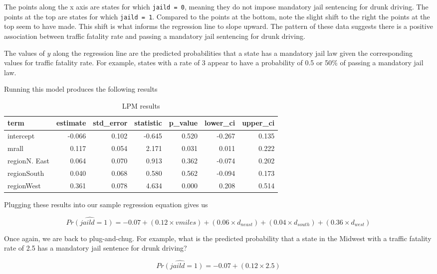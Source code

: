 \documentclass[
]{book}
\begin{document}
The points along the x axis are states for which \texttt{jaild\ =\ 0}, meaning they do not impose mandatory jail sentencing for drunk driving. The points at the top are states for which \texttt{jaild\ =\ 1}. Compared to the points at the bottom, note the slight shift to the right the points at the top seem to have made. This shift is what informs the regression line to slope upward. The pattern of these data suggests there is a positive association between traffic fatality rate and passing a mandatory jail sentencing for drunk driving.

The values of \(y\) along the regression line are the predicted probabilities that a state has a mandatory jail law given the corresponding values for traffic fatality rate. For example, states with a rate of 3 appear to have a probability of 0.5 or 50\% of passing a mandatory jail law.

Running this model produces the following results

\begin{table}

\caption{\label{tab:lpmresults}LPM results}
\centering
\begin{tabular}[t]{l|r|r|r|r|r|r}
\hline
term & estimate & std\_error & statistic & p\_value & lower\_ci & upper\_ci\\
\hline
intercept & -0.066 & 0.102 & -0.645 & 0.520 & -0.267 & 0.135\\
\hline
mrall & 0.117 & 0.054 & 2.171 & 0.031 & 0.011 & 0.222\\
\hline
regionN. East & 0.064 & 0.070 & 0.913 & 0.362 & -0.074 & 0.202\\
\hline
regionSouth & 0.040 & 0.068 & 0.580 & 0.562 & -0.094 & 0.173\\
\hline
regionWest & 0.361 & 0.078 & 4.634 & 0.000 & 0.208 & 0.514\\
\hline
\end{tabular}
\end{table}

Plugging these results into our sample regression equation gives us

\[\hat{Pr(jaild=1)}= -0.07 + (0.12 \times vmiles) + (0.06 \times d_{neast}) + (0.04 \times d_{south}) + (0.36 \times d_{west})\]

Once again, we are back to plug-and-chug. For example, what is the predicted probability that a state in the Midwest with a traffic fatality rate of 2.5 has a mandatory jail sentence for drunk driving?

\[\hat{Pr(jaild=1)}= -0.07 + (0.12 \times 2.5)\]
\end{document}

